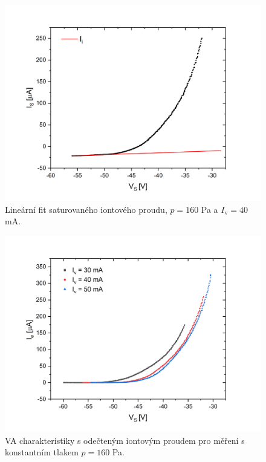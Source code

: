 \documentclass[a4paper,12pt]{article}
\begin{document}
\begin{figure}[h]
	\centering
	\includegraphics[width=145mm]{iiont.png}
	\caption{Lineární fit saturovaného iontového proudu, $p = 160$ \si{\pascal} a $I_\text{v} = 40$ \si{\milli\ampere}.}
	\label{iiont}
\end{figure}

\newpage
\begin{figure}[h!]
	\centering
	\includegraphics[width=135mm]{odectene012.png}
	\caption{VA charakteristiky s odečteným iontovým proudem pro měření s konstantním tlakem $p = 160$ \si{\pascal}.}
	\label{odectene012}
\end{figure}
\end{document}
